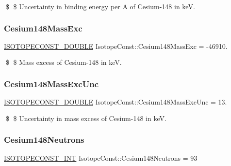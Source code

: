 \$ \$ Uncertainty in binding energy per A of Cesium-\/148 in keV. \mbox{\label{group___isotope_const-_cesium-_cs148_ga5f2ed2a9aa5f9fe4d617a827d9e0925b}} 
\subsubsection{\texorpdfstring{Cesium148\+Mass\+Exc}{Cesium148MassExc}}
{\footnotesize\ttfamily \mbox{\hyperlink{group___isotope_const-_macros_ga8f45a7272ce02c0b4c65c44636ed719a}{I\+S\+O\+T\+O\+P\+E\+C\+O\+N\+S\+T\+\_\+\+D\+O\+U\+B\+LE}} Isotope\+Const\+::\+Cesium148\+Mass\+Exc = -\/46910.}

\$ \$ Mass excess of Cesium-\/148 in keV. \mbox{\label{group___isotope_const-_cesium-_cs148_ga5c1fc00c22280f1f3fde156583f6aff6}} 
\subsubsection{\texorpdfstring{Cesium148\+Mass\+Exc\+Unc}{Cesium148MassExcUnc}}
{\footnotesize\ttfamily \mbox{\hyperlink{group___isotope_const-_macros_ga8f45a7272ce02c0b4c65c44636ed719a}{I\+S\+O\+T\+O\+P\+E\+C\+O\+N\+S\+T\+\_\+\+D\+O\+U\+B\+LE}} Isotope\+Const\+::\+Cesium148\+Mass\+Exc\+Unc = 13.}

\$ \$ Uncertainty in mass excess of Cesium-\/148 in keV. \mbox{\label{group___isotope_const-_cesium-_cs148_gabbf9fd2fecfeddd909dafd02b92e9083}} 
\subsubsection{\texorpdfstring{Cesium148\+Neutrons}{Cesium148Neutrons}}
{\footnotesize\ttfamily \mbox{\hyperlink{group___isotope_const-_macros_ga5f18360b3e99483a35c32d789e62621c}{I\+S\+O\+T\+O\+P\+E\+C\+O\+N\+S\+T\+\_\+\+I\+NT}} Isotope\+Const\+::\+Cesium148\+Neutrons = 93}

